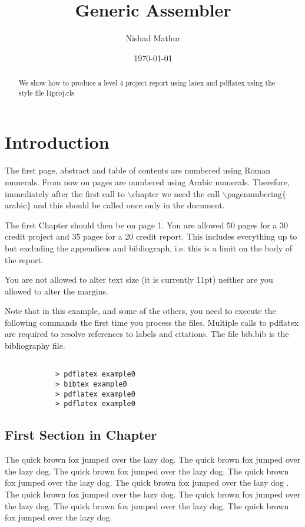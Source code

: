 \documentclass{l4proj}
\title{Generic Assembler	}
\author{Nishad Mathur}
\date{\today}
\begin{document}
\maketitle

\begin{abstract}
We show how to produce a level 4 project report using latex and pdflatex using the 
style file l4proj.cls
\end{abstract}

\educationalconsent
%
%

\tableofcontents




\chapter{Introduction}
The first page, abstract and table of contents are numbered using Roman numerals. From now on pages are numbered
using Arabic numerals. Therefore, immediately after the first call to $\backslash$chapter we need the call
$\backslash$pagenumbering$\{$arabic$\}$ and this should be called once only in the document. 

The first Chapter should then be on page 1. You are allowed 50 pages for a 30 credit project and 35 pages for a 
20 credit report. This includes everything up to but excluding the appendices and bibliograph, i.e. this is a limit on
the body of the report.

You are not allowed to alter text size (it is currently 11pt) neither are you allowed to alter the margins.

Note that in this example, and some of the others, you need to execute the following commands the first time you process the files.
Multiple calls to pdflatex are required to resolve references to labels and citations. The file bib.bib is the bibliography file.

\begin{verbatim}

            > pdflatex example0
            > bibtex example0
            > pdflatex example0
            > pdflatex example0

\end{verbatim}


\section{First Section in Chapter}
The quick brown fox jumped over the lazy dog.
The quick brown fox jumped over the lazy dog.
The quick brown fox jumped over the lazy dog.
The quick brown fox jumped over the lazy dog.
The quick brown fox jumped over the lazy dog \cite{DIMACS}.
The quick brown fox jumped over the lazy dog.
The quick brown fox jumped over the lazy dog.
The quick brown fox jumped over the lazy dog.
The quick brown fox jumped over the lazy dog.
\end{document}
